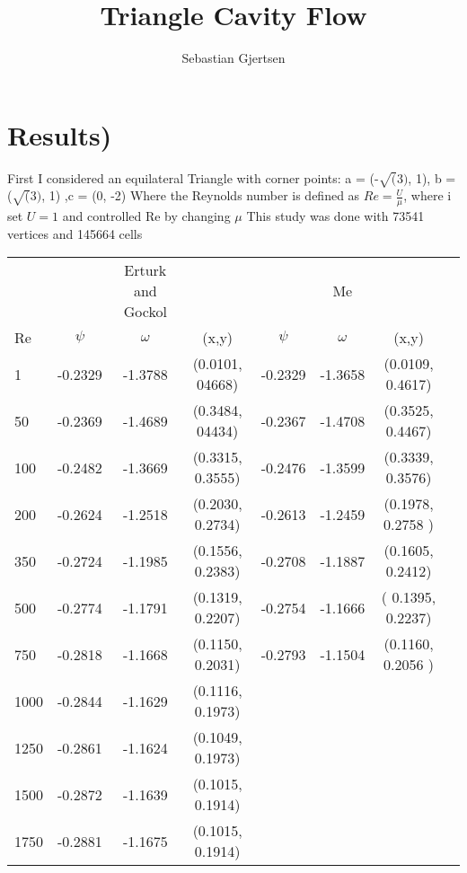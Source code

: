 \documentclass[a4paper,norsk]{article}
\title{Triangle Cavity Flow}
\author{Sebastian Gjertsen}
\begin{document}
\maketitle


\section*{Results)}
First I considered an equilateral Triangle with corner points: \newline
a = (-$\sqrt(3)$, 1), b = ($\sqrt(3)$, 1) ,c = (0, -2) \newline
\newline
Where the Reynolds number is defined as $Re = \frac{U}{\mu} $, where i set $U=1$ and controlled Re by changing $\mu$
\newline
This study was done with 73541 vertices and 145664 cells
\newline
\begin{tabular}{l*{6}{c}r}
   & &Erturk and Gockol & & & Me\\
  Re & $\psi$ & $\omega$ &(x,y) & $\psi$ & $\omega$ & (x,y)  \\
  1   &   -0.2329  &-1.3788  & (0.0101, 04668) &-0.2329 & -1.3658  & (0.0109, 0.4617)  \\
  50   &  -0.2369 & -1.4689 & (0.3484, 04434)  & -0.2367 &-1.4708 & (0.3525, 0.4467)    \\
  100  & -0.2482 & -1.3669 & (0.3315, 0.3555)   & -0.2476 & -1.3599 &(0.3339, 0.3576)  \\
  200   & -0.2624 &-1.2518  & (0.2030, 0.2734)  & -0.2613 & -1.2459 & (0.1978, 0.2758 ) \\
  350   & -0.2724 & -1.1985 & (0.1556, 0.2383) &-0.2708 & -1.1887 & (0.1605, 0.2412)   \\
  500   & -0.2774 & -1.1791 &  (0.1319, 0.2207)  & -0.2754 &  -1.1666 & ( 0.1395, 0.2237)       \\
  750   &  -0.2818 & -1.1668 &  (0.1150, 0.2031) & -0.2793  & -1.1504  & (0.1160, 0.2056 ) \\
  1000   & -0.2844 & -1.1629 &(0.1116, 0.1973)  \\
  1250   & -0.2861 & -1.1624 & (0.1049, 0.1973)  \\
  1500   & -0.2872 & -1.1639 & (0.1015, 0.1914)  \\
  1750   &  -0.2881 & -1.1675 & (0.1015, 0.1914) \\ 
\hline
\end{tabular}
\newline
\newline
\end{document}
